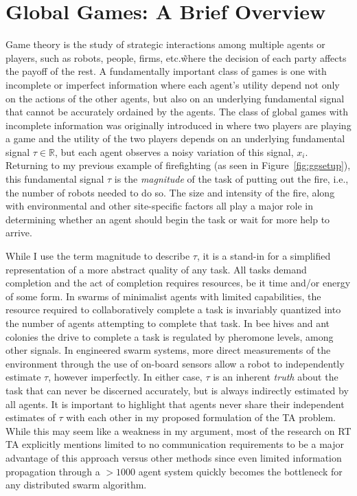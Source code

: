 \documentclass[defaultstyle,12pt]{thesis}
\begin{document}
\section{Global Games: A Brief Overview}\label{sec:ggoverview}
Game theory is the study of strategic interactions among multiple agents or players, such as robots, people, firms, etc.\~where the decision of each party affects the payoff of the rest. A fundamentally important class of games is one with incomplete or imperfect information where each agent's utility depend not only on the actions of the other agents, but also on an underlying fundamental signal that cannot be accurately ordained by the agents. The class of global games with incomplete information was originally introduced in \cite{Carlsson1993} where two players are playing a game and the utility of the two players depends on an underlying fundamental signal $\tau \in \mathbb{R}$, but each agent observes a noisy variation of this signal, $x_i$. Returning to my previous example of firefighting (as seen in Figure~\ref{fig:ggsetup}), this fundamental signal $\tau$ is the \emph{magnitude} of the task of putting out the fire, i.e., the number of robots needed to do so. The size and intensity of the fire, along with environmental and other site-specific factors all play a major role in determining whether an agent should begin the task or wait for more help to arrive.

While I use the term magnitude to describe $\tau$, it is a stand-in for a simplified representation of a more abstract quality of any task. All tasks demand completion and the act of completion requires resources, be it time and/or energy of some form. In swarms of minimalist agents with limited capabilities, the resource required to collaboratively complete a task is invariably quantized into the number of agents attempting to complete that task. In bee hives and ant colonies the drive to complete a task is regulated by pheromone levels, among other signals.  In engineered swarm systems, more direct measurements of the environment through the use of on-board sensors allow a robot to independently estimate $\tau$, however imperfectly. In either case, $\tau$ is an inherent \emph{truth} about the task that can never be discerned accurately, but is always indirectly estimated by all agents. It is important to highlight that agents never share their independent estimates of $\tau$ with each other in my proposed formulation of the TA problem. While this may seem like a weakness in my argument, most of the research on RT TA explicitly mentions limited to no communication requirements to be a major advantage of this approach versus other methods since even limited information propagation through a $>1000$ agent system quickly becomes the bottleneck for any distributed swarm algorithm.
\end{document}
